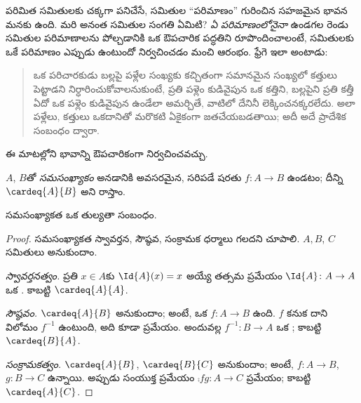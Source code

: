 \documentclass[../../../include/open-logic-section]{subfiles}
\begin{document}


పరిమిత సమితులకు చక్కగా పనిచేసే, సమితుల ``పరిమాణం'' గురించిన సహజమైన
భావన మనకు ఉంది. మరి అనంత సమితుల సంగతి ఏమిటి? \emph{ఏ పరిమాణంలోనైనా}
ఉండగల రెండు సమితుల పరిమాణాలను పోల్చడానికి ఒక ఔపచారిక పద్ధతిని
రూపొందించాలంటే, సమితులకు ఒకే పరిమాణం ఎప్పుడు ఉంటుందో నిర్వచించడం
మంచి ఆరంభం. ఫ్రేగె ఇలా అంటాడు:
\begin{quote}
  ఒక పరిచారకుడు బల్లపై పళ్లేల సంఖ్యకు కచ్చితంగా సమానమైన సంఖ్యలో
  కత్తులు పెట్టాడని నిర్ధారించుకోవాలనుకుంటే, ప్రతి పళ్లెం కుడివైపున
  ఒక కత్తిని, బల్లపైని ప్రతి కత్తీ ఏదో ఒక పళ్లెం కుడివైపున ఉండేలా
  అమర్చితే, వాటిలో దేనినీ లెక్కించనక్కరలేదు. అలా పళ్లేలు, కత్తులు
  ఒకదానితో మరొకటి ఏకైకంగా జతచేయబడతాయి; అదీ అదే ప్రాదేశిక
  సంబంధం ద్వారా. \citep[\S70]{Frege1884}
\end{quote}
ఈ మాటల్లోని భావాన్ని ఔపచారికంగా నిర్వచించవచ్చు.

\begin{defn}
  $A$, $B$తో \emph{సమసంఖ్యాకం} అనడానికి అవసరమైన, సరిపడే షరతు
   $f \colon A \to B$ ఉండటం; దీన్ని $\cardeq{A}{B}$ అని రాస్తాం.
\end{defn}

\begin{prop}
సమసంఖ్యాకత ఒక తుల్యతా సంబంధం.
\end{prop}

\begin{proof}
సమసంఖ్యాకత స్వావర్తన, సౌష్ఠవ, సంక్రామక ధర్మాలు గలదని చూపాలి.
$A, B$, $C$ సమితులు అనుకుందాం.

\emph{స్వావర్తనత్వం.} ప్రతి $x \in A$కు $\Id{A} (x) = x$ అయ్యే
తత్సమ ప్రమేయం $\Id{A} \colon A \to A$ ఒక .
కాబట్టి $\cardeq{A}{A}$.

\emph{సౌష్ఠవం.} $\cardeq{A}{B}$ అనుకుందాం; అంటే, ఒక
 $f\colon A \to B$ ఉంది. $f$  కనుక దాని
విలోమం $f^{-1}$ ఉంటుంది, అది కూడా  ప్రమేయం. అందువల్ల
$f^{-1}\colon B \to A$ ఒక ; కాబట్టి $\cardeq{B}{A}$.

\emph{సంక్రామకత్వం.} $\cardeq{A}{B}$, $\cardeq{B}{C}$ అనుకుందాం;
అంటే,  $f\colon A \to B$, $g\colon B \to C$ ఉన్నాయి.
అప్పుడు సంయుక్త ప్రమేయం $\comp{f}{g}\colon A \to C$  ప్రమేయం; కాబట్టి
$\cardeq{A}{C}$.
\end{proof}
\end{document}
